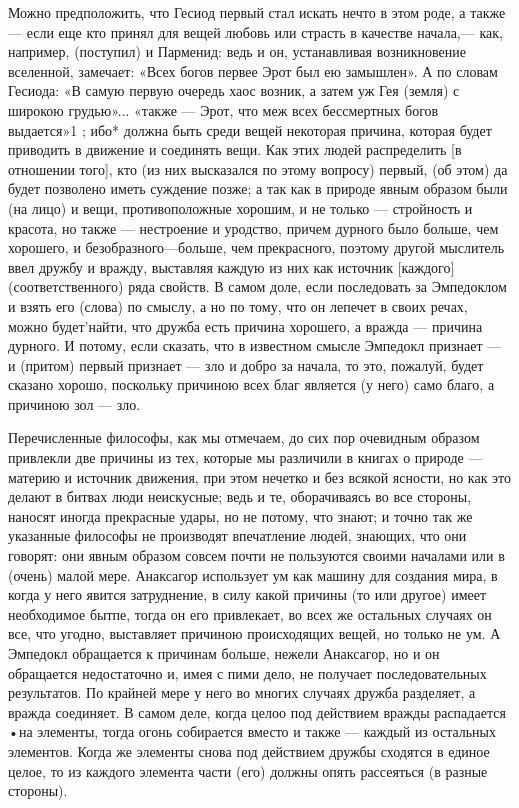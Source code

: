 \documentclass{article}
\begin{document}
Можно предположить, что Гесиод первый стал искать нечто в этом роде, а также — если еще кто принял для вещей любовь или страсть в качестве начала,— как, например, (поступил) и Парменид: ведь и он, устанавливая возникновение вселенной, замечает: «Всех богов первее Эрот был ею замышлен». А по словам Гесиода:
\footnotemark[1]
«В самую первую очередь хаос возник, а затем уж Гея (земля) с широкою грудью»... «также — Эрот, что меж всех бессмертных богов выдается»1 ; ибо* должна быть среди вещей некоторая причина, которая будет приводить в движение и соединять вещи. Как этих людей распределить [в отношении того], кто (из них высказался по этому вопросу) первый, (об этом) да будет позволено иметь суждение позже; а так как в природе явным образом были (на лицо) и вещи, противоположные хорошим, и не только — стройность и красота, но также — нестроение и уродство, причем дурного было больше, чем хорошего, и безобразного—больше, чем прекрасного, поэтому другой мыслитель ввел дружбу и вражду, выставляя каждую из них как источник [каждого] (соответственного) ряда свойств. В самом доле, если последовать за Эмпедоклом и взять его (слова) по смыслу, а но по тому, что он лепечет в своих речах, можно будет'найти, что дружба есть причина хорошего, а вражда — причина дурного. И потому, если сказать, что в известном смысле Эмпедокл признает — и (притом) первый признает — зло и добро за начала, то это, пожалуй, будет сказано хорошо, поскольку причиною всех благ является (у него) само благо, а причиною зол — зло.

Перечисленные философы, как мы отмечаем, до сих пор очевидным образом привлекли две причины из тех, которые мы различили в книгах о природе
\footnotemark[2]
— материю и источник движения, при этом нечетко и без всякой ясности, но как это делают в битвах люди неискусные; ведь и те, оборачиваясь во все стороны, наносят иногда прекрасные удары, но не потому, что знают; и точно так же указанные философы не производят впечатление людей, знающих, что они говорят: они явным образом совсем почти не пользуются своими началами или в (очень) малой мере. Анаксагор использует ум как машину для создания мира, в когда у него явится затруднение, в силу какой причины (то или другое) имеет необходимое бытпе, тогда он его привлекает, во всех же остальных случаях он все, что угодно, выставляет причиною происходящих вещей, но только не ум.
\footnotemark[3]
А Эмпедокл обращается к причинам больше, нежели Анаксагор, но и он обращается недостаточно и, имея с пими дело, не получает последовательных результатов. По крайней мере у него во многих случаях дружба разделяет, а вражда соединяет. В самом деле, когда целоо под действием вражды распадается •на элементы, тогда огонь собирается вместо и также — каждый из остальных элементов. Когда же элементы снова под действием дружбы сходятся в единое целое, то из каждого элемента части (его) должны опять рассеяться (в разные стороны).
\end{document}
